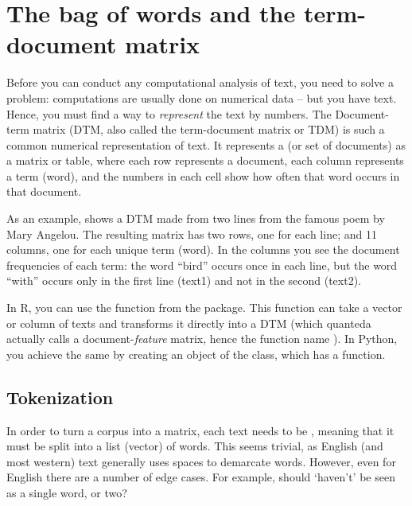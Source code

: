 \section{The bag of words and the term-document matrix}
\label{sec:dtm}

Before you can conduct any computational analysis of text, you need to solve a problem: computations are usually done on numerical data -- but you have text. Hence, you must find a way to \emph{represent} the text by numbers.
The Document-term matrix (DTM, also called the term-document matrix or TDM) is such a common numerical representation of text.
It represents a  (or set of documents) as a matrix or table, where each row represents a document, each column represents a term (word),
and the numbers in each cell show how often that word occurs in that document.


As an example,  shows a DTM made from two lines from the famous poem by Mary Angelou.
The resulting matrix has two rows, one for each line; and 11 columns, one for each unique term (word).
In the columns you see the document frequencies of each term: the word ``bird'' occurs once in each line,
but the word ``with'' occurs only in the first line (text1) and not in the second (text2).

In R, you can use the  function from the  package.
This function can take a vector or column of texts and transforms it directly into a DTM
(which quanteda actually calls a document-\emph{feature} matrix, hence the function name ).
In Python, you achieve the same by creating an object of the  class, which has a  function.


\subsection{Tokenization}

In order to turn a corpus into a matrix, each text needs to be ,
meaning that it must be split into a list (vector) of words.
This seems trivial, as English (and most western) text generally uses spaces to demarcate words.
However, even for English there are a number of edge cases. 
For example, should `haven't' be seen as a single word, or two?


